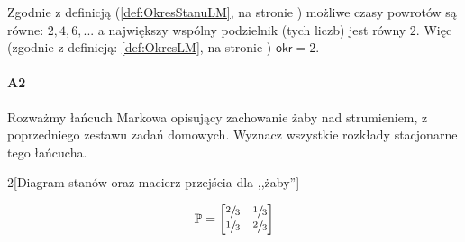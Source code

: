 \documentclass[a4paper,12pt]{article}
\theoremstyle{definition}%
\theoremstyle{definition}
\theoremstyle{problem}
\begin{document}
Zgodnie z definicją (\ref{def:OkresStanuLM}, na stronie \pageref{def:OkresStanuLM}) możliwe czasy powrotów są równe: $2, 4, 6, ...$ a największy wspólny podzielnik (tych liczb) jest równy $2$. Więc (zgodnie z definicją: \ref{def:OkresLM}, na stronie \pageref{def:OkresLM}) $\mathsf{okr}=2$.

\paragraph{A2} Rozważmy łańcuch Markowa opisujący zachowanie żaby nad strumieniem, z poprzedniego zestawu zadań domowych. Wyznacz wszystkie rozkłady stacjonarne tego łańcucha.

\begin{multicols}{2}[Diagram stanów oraz macierz przejścia dla ,,żaby'']
\begin{figure}[H]
\centering
{}
\end{figure}

$$\mathbb{P}=\begin{bmatrix}
\sfrac{2}{3}&\sfrac{1}{3}\\
\sfrac{1}{3}&\sfrac{2}{3}
\end{bmatrix}$$
\end{multicols}
\end{document}
